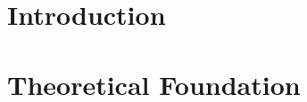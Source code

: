 \documentclass[12pt, a4paper]{report}
\begin{document}
% 

% 

% 

% 


\chapter{Introduction}


\chapter{Theoretical Foundation}


% 





\printbibliography
\end{document}
